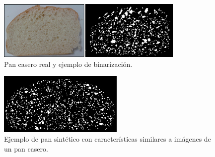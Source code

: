\begin{figure}[!ht]
\begin{center}
\includegraphics[width=9cm]{figures/realbin2}
\caption{ Pan casero real y ejemplo de binarización.}
\label{realbin2}
\end{center}
\end{figure}

\begin{figure}[!ht]
\begin{center}
\includegraphics[width=6cm]{figures/best2}
\caption{Ejemplo de pan sintético con características similares a imágenes de un pan casero.}
\label{best2}
\end{center}
\end{figure}






